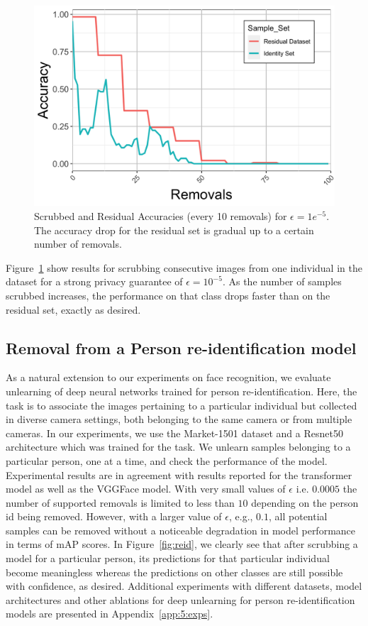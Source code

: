 \begin{figure}
	\centering
	\includegraphics[width=0.48\columnwidth]{5_unlearn/figs/scrub/VGG_Scrub_1.png}
	\caption[Removal performance in a pretrained VGG model]{Scrubbed and Residual Accuracies (every 10 removals) for $\epsilon = 1e^{-5}$. The accuracy drop for the residual set is gradual up to a certain number of removals.}
	\label{fig:vgg}
\end{figure}

Figure~\ref{fig:vgg} show results for scrubbing consecutive images from one individual in the dataset for a strong privacy guarantee of $\epsilon=10^{-5}$. As the number of samples scrubbed increases, the performance on that class drops faster than on the residual set, exactly as desired.

\subsection{Removal from a Person re-identification model}
As a natural extension to our experiments on face recognition, we evaluate unlearning of deep neural networks trained for person re-identification. Here, the task is to associate the images pertaining to a particular individual but collected in diverse camera settings, both belonging to the same camera or from multiple cameras. In our experiments, we use the Market-1501 dataset \citep{zheng2015scalable} and a Resnet50 architecture which was trained for the task. We unlearn samples belonging to a particular person, one at a time, and check the performance of the model. Experimental results are in agreement with results reported for the transformer model as well as the VGGFace model. With very small values of $\epsilon$ i.e. $0.0005$ the number of supported removals is limited to less than $10$ depending on the person id being removed. However, with a larger value of $\epsilon$, e.g., $0.1$, all potential samples can be removed without a noticeable degradation in model performance in terms of mAP scores. In Figure~\ref{fig:reid}, we clearly see that after scrubbing a model for a particular person, its predictions for that particular individual become meaningless whereas the predictions on other classes are still possible with confidence, as desired. Additional experiments with different datasets, model architectures and other ablations for deep unlearning for person re-identification models are presented in Appendix~\ref{app:5:exps}.

